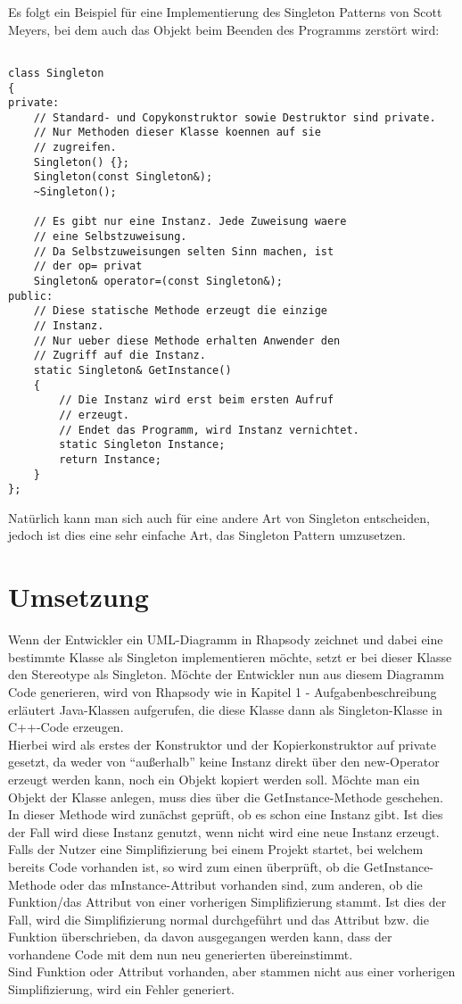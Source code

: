 Es folgt ein Beispiel für eine Implementierung des Singleton Patterns von Scott Meyers, bei dem auch das Objekt beim Beenden des Programms zerstört wird:
\begin{lstlisting}

class Singleton
{
private:
    // Standard- und Copykonstruktor sowie Destruktor sind private. 
    // Nur Methoden dieser Klasse koennen auf sie 
    // zugreifen.
    Singleton() {};
    Singleton(const Singleton&);
    ~Singleton();

    // Es gibt nur eine Instanz. Jede Zuweisung waere
    // eine Selbstzuweisung.
    // Da Selbstzuweisungen selten Sinn machen, ist
    // der op= privat
    Singleton& operator=(const Singleton&);
public:
    // Diese statische Methode erzeugt die einzige
    // Instanz.
    // Nur ueber diese Methode erhalten Anwender den 
    // Zugriff auf die Instanz.
    static Singleton& GetInstance() 
    {
        // Die Instanz wird erst beim ersten Aufruf
        // erzeugt.
        // Endet das Programm, wird Instanz vernichtet.
        static Singleton Instance;
        return Instance;
    }
};
\end{lstlisting}

Natürlich kann man sich auch für eine andere Art von Singleton entscheiden, jedoch ist dies eine sehr einfache Art, das Singleton Pattern umzusetzen.
\cite{singelton}\cite{singelton2}
\section{Umsetzung}

Wenn der Entwickler ein UML-Diagramm in Rhapsody zeichnet und dabei eine bestimmte Klasse als Singleton implementieren möchte, setzt er bei dieser Klasse den Stereotype als Singleton. Möchte der Entwickler nun aus diesem Diagramm Code generieren, wird von Rhapsody wie in Kapitel 1 - Aufgabenbeschreibung erläutert Java-Klassen aufgerufen, die diese Klasse dann als Singleton-Klasse in C++-Code erzeugen. 
\\
Hierbei wird als erstes der Konstruktor und der Kopierkonstruktor auf private
gesetzt, da weder von \enquote{außerhalb} keine Instanz direkt über den
new-Operator erzeugt werden kann, noch ein Objekt kopiert werden soll. Möchte
man ein Objekt der Klasse anlegen, muss dies über die GetInstance-Methode
geschehen. In dieser Methode wird zunächst geprüft, ob es schon eine Instanz
gibt. Ist dies der Fall wird diese Instanz genutzt, wenn nicht wird eine neue Instanz erzeugt.\\


Falls der Nutzer eine Simplifizierung bei einem Projekt startet, bei welchem
bereits Code vorhanden ist, so wird zum einen überprüft, ob die
GetInstance-Methode oder das mInstance-Attribut vorhanden sind, zum anderen, ob
die Funktion/das Attribut von einer vorherigen Simplifizierung stammt. Ist dies
der Fall, wird die Simplifizierung normal durchgeführt und das Attribut bzw. die
Funktion überschrieben, da davon ausgegangen werden kann, dass der vorhandene
Code mit dem nun neu generierten übereinstimmt. \\
Sind Funktion oder Attribut vorhanden, aber stammen nicht aus einer vorherigen
Simplifizierung, wird ein Fehler generiert.
